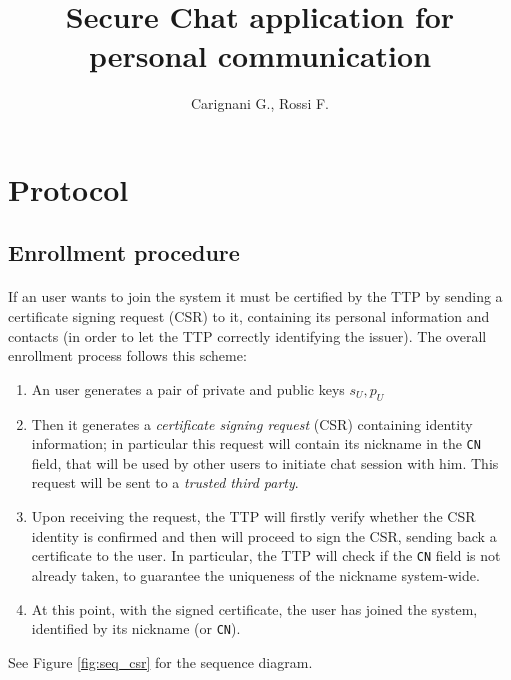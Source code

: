 \documentclass[twocolumn]{article}
\title{Secure Chat application for personal communication}
\author{Carignani G., Rossi F.}
\begin{document}
\maketitle
\section{Protocol}

\subsection{Enrollment procedure}
\label{sec:cert}
\paragraph{}If an user wants to join the system it must be certified by the TTP by sending a certificate signing request (CSR) to it, containing its personal information and contacts (in order to let the TTP correctly identifying the issuer). The overall enrollment process follows this scheme:
\begin{enumerate}
	\item An user generates a pair of private and public keys $s_U,p_U$
	\item Then it generates a \textit{certificate signing request} (CSR) containing identity information; in particular this request will contain its nickname in the \texttt{CN} field, that will be used by other users to initiate chat session with him. This request will be sent to a \textit{trusted third party}.
	\item Upon receiving the request, the TTP will firstly verify whether the CSR identity is confirmed and then will proceed to sign the CSR, sending back a certificate to the user. In particular, the TTP will check if the \texttt{CN} field is not already taken, to guarantee the uniqueness of the nickname system-wide.
	\item At this point, with the signed certificate, the user has joined the system, identified by its nickname (or \texttt{CN}).
\end{enumerate}
See Figure \ref{fig:seq_csr} for the sequence diagram.
\end{document}
